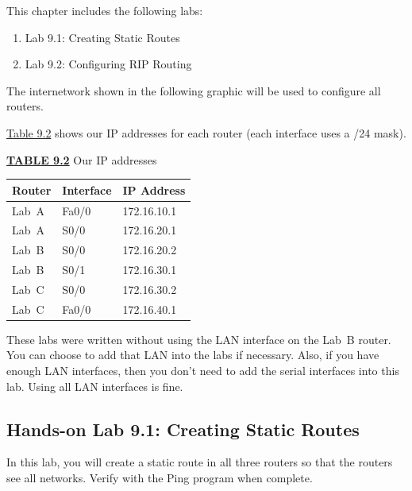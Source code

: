 This chapter includes the following labs:

\begin{enumerate}
\item
  Lab 9.1: Creating Static Routes
\item
  Lab 9.2: Configuring RIP Routing
\end{enumerate}

The internetwork shown in the following graphic will be used to
configure all routers.

\begin{figure}
\centering
\caption{}
\end{figure}

\protect\hyperlink{c09.xhtmlux5cux23table9-2}{Table 9.2} shows our IP
addresses for each router (each interface uses a /24 mask).

{\protect\hyperlink{c09.xhtmlux5cux23tableanchor9-2}{\textbf{TABLE 9.2}}
Our IP addresses}

\begin{longtable}[]{@{}lll@{}}
\toprule
Router & Interface & IP Address\tabularnewline
\midrule
\endhead
Lab~A & Fa0/0 & 172.16.10.1\tabularnewline
Lab~A & S0/0 & 172.16.20.1\tabularnewline
Lab~B & S0/0 & 172.16.20.2\tabularnewline
Lab~B & S0/1 & 172.16.30.1\tabularnewline
Lab~C & S0/0 & 172.16.30.2\tabularnewline
Lab~C & Fa0/0 & 172.16.40.1\tabularnewline
\bottomrule
\end{longtable}

\protect\hypertarget{c09.xhtmlux5cux23Page_402}{}{}These labs were
written without using the LAN interface on the Lab~B router. You can
choose to add that LAN into the labs if necessary. Also, if you have
enough LAN interfaces, then you don't need to add the serial interfaces
into this lab. Using all LAN interfaces is fine.

\subsection[Hands-on Lab 9.1: Creating Static
Routes]{\texorpdfstring{\protect\hypertarget{c09.xhtmlux5cux23c09-sec-21}{}{}Hands-on
Lab 9.1: Creating Static
Routes}{Hands-on Lab 9.1: Creating Static Routes}}

In this lab, you will create a static route in all three routers so that
the routers see all networks. Verify with the Ping program when
complete.

